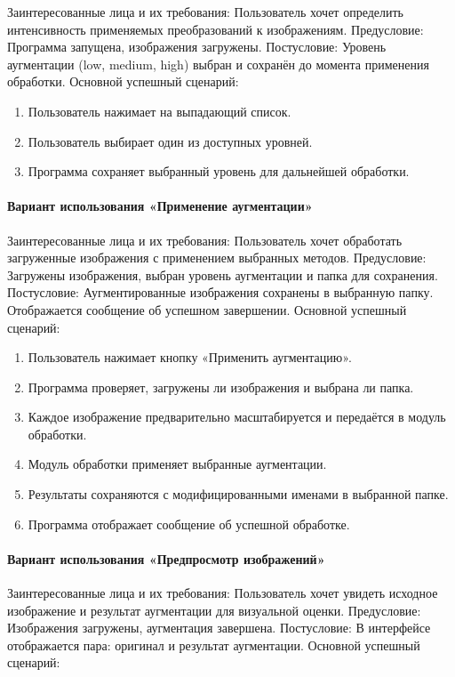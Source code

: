 Заинтересованные лица и их требования:
Пользователь хочет определить интенсивность применяемых преобразований к изображениям.
Предусловие:
Программа запущена, изображения загружены.
Постусловие:
Уровень аугментации (low, medium, high) выбран и сохранён до момента применения обработки.
Основной успешный сценарий:

\begin{enumerate}
	\item Пользователь нажимает на выпадающий список.
	\item Пользователь выбирает один из доступных уровней.
	\item Программа сохраняет выбранный уровень для дальнейшей обработки.
\end{enumerate}

\paragraph{Вариант использования «Применение аугментации»}

Заинтересованные лица и их требования:
Пользователь хочет обработать загруженные изображения с применением выбранных методов.
Предусловие:
Загружены изображения, выбран уровень аугментации и папка для сохранения.
Постусловие:
Аугментированные изображения сохранены в выбранную папку. Отображается сообщение об успешном завершении.
Основной успешный сценарий:

\begin{enumerate}
	\item Пользователь нажимает кнопку «Применить аугментацию».
	\item Программа проверяет, загружены ли изображения и выбрана ли папка.
	\item Каждое изображение предварительно масштабируется и передаётся в модуль обработки.
	\item Модуль обработки применяет выбранные аугментации.
	\item Результаты сохраняются с модифицированными именами в выбранной папке.
	\item Программа отображает сообщение об успешной обработке.
\end{enumerate}

\paragraph{Вариант использования «Предпросмотр изображений»}

Заинтересованные лица и их требования:
Пользователь хочет увидеть исходное изображение и результат аугментации для визуальной оценки.
Предусловие:
Изображения загружены, аугментация завершена.
Постусловие:
В интерфейсе отображается пара: оригинал и результат аугментации.
Основной успешный сценарий:

